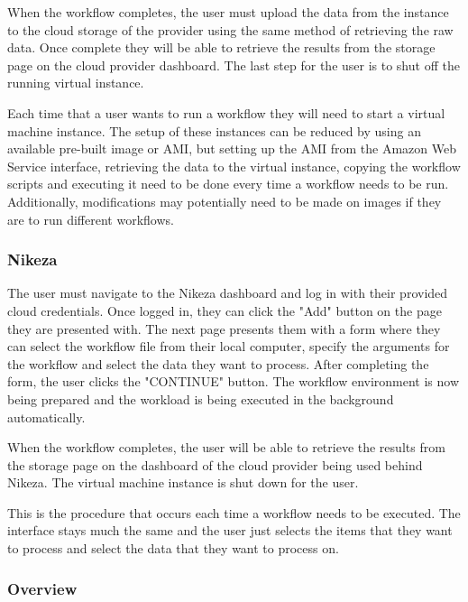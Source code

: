 When the workflow completes, the user must upload the data from the instance to the cloud storage of the provider using the same method of retrieving the raw data. Once complete they will be able to retrieve the results from the storage page on the cloud provider dashboard. The last step for the user is to shut off the running virtual instance.

Each time that a user wants to run a workflow they will need to start a virtual machine instance. The setup of these instances can be reduced by using an available pre-built image or AMI, but setting up the AMI from the Amazon Web Service interface, retrieving the data to the virtual instance, copying the workflow scripts and executing it need to be done every time a workflow needs to be run. Additionally, modifications may potentially need to be made on images if they are to run different workflows.

\subsubsection{Nikeza}
The user must navigate to the Nikeza dashboard and log in with their provided cloud credentials. Once logged in, they can click the "Add" button on the page they are presented with. The next page presents them with a form where they can select the workflow file from their local computer, specify the arguments for the workflow and select the data they want to process. After completing the form, the user clicks the "CONTINUE" button. The workflow environment is now being prepared and the workload is being executed in the background automatically.

When the workflow completes, the user will be able to retrieve the results from the storage page on the dashboard of the cloud provider being used behind Nikeza. The virtual machine instance is shut down for the user.

This is the procedure that occurs each time a workflow needs to be executed. The interface stays much the same and the user just selects the items that they want to process and select the data that they want to process on.

\subsubsection{Overview}


